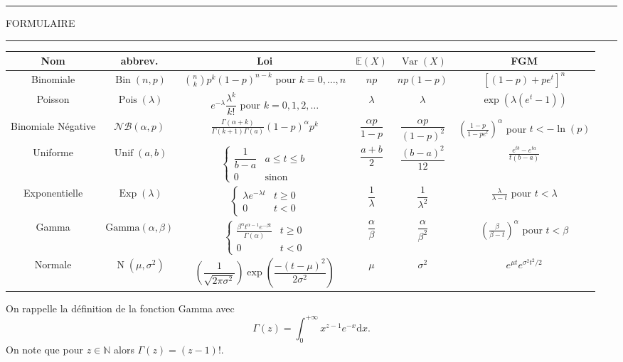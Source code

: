 \documentclass[11pt, addpoints, answers]{exam}
\def\Bin{\operatorname{Bin}}
\def\Var{\operatorname{Var}}
\def\Pois{\operatorname{Pois}}
\def\Exp{\operatorname{Exp}}
\def\Unif{\operatorname{Unif}}
\def\No{\operatorname{N}}
\newcommand{\E}{\mathbb E}            %
\def\Var{\operatorname{Var}}
\begin{document}
\newpage
\hrule
\vspace*{.15in}
\begin{center}
  \large\MakeUppercase{Formulaire}
\end{center}
\vspace*{.15in}
\hrule
\vspace*{.25in}

\renewcommand\arraystretch{3.5}
\begin{table}[H]
\begin{center}
\footnotesize
\begin{tabular}{|c|c|c|c|c|c|}

\hline
Nom & abbrev. & Loi & $\E(X)$ & $\Var(X)$ & FGM\\
\hline\hline
Binomiale & $\Bin(n,p)$ & $\binom{n}{k}p^k(1-p)^{n-k}$ pour $k = 0,\ldots,n$ & $np$ & $np(1-p)$ & $[(1-p)+pe^t]^n$\\
\hline
Poisson & $\Pois(\lambda)$ & $e^{-\lambda}\dfrac{\lambda^k}{k!}$ pour $k = 0,1,2,\ldots$ & $\lambda$ & $\lambda$ &$ \exp(\lambda(e^t-1))$\\
\hline
Binomiale Négative & $\mathcal{NB}(\alpha, p)$ & $\frac{\Gamma(\alpha+k)}{\Gamma(k+1)\Gamma(a)}(1-p)^{\alpha}p^k$ & $\dfrac{\alpha p }{1-p}$ & $\dfrac{\alpha p }{(1-p)^2}$ & $\left(\frac{1-p}{1-pe^t}\right)^\alpha$ pour  $t<-\ln(p)$\\
\hline
Uniforme & $\Unif(a,b)$ & $\begin{cases} \dfrac{1}{b-a} & a\leq t\leq b\\ 0 & \text{sinon}\end{cases}
$ & $\dfrac{a+b}{2}$ & $\dfrac{(b-a)^2}{12}$ & $\frac{e^{tb}-e^{ta}}{t(b-a)}$\\
\hline
Exponentielle & $\Exp(\lambda)$ & $\begin{cases} \lambda e^{-\lambda t} & t\geq 0 \\ 0 & t<0\end{cases}$ & $\dfrac{1}{\lambda}$ & $\dfrac{1}{\lambda^2}$ & $\frac{\lambda}{\lambda -t}$ pour $t<\lambda$\\
\hline
Gamma & $\text{Gamma}(\alpha,\beta)$ & $\begin{cases} \frac{\beta^\alpha t^{\alpha-1} e^{-\beta t}}{\Gamma(\alpha)} & t\geq 0 \\ 0 & t<0\end{cases}$ & $\dfrac{\alpha}{\beta}$ & $\dfrac{\alpha}{\beta^2}$ & $\left(\frac{\beta}{\beta -t}\right)^\alpha$ pour $t<\beta$\\
\hline
Normale & $\No(\mu,\sigma^2)$ & $\left(\dfrac{1}{\sqrt{2\pi\sigma^2}}\right)\operatorname{exp}{\left(\dfrac{-(t-\mu)^2}{2\sigma^2}\right)}$ & $\mu$ & $\sigma^2$ & $e^{\mu t}e^{\sigma^2t^2/2}$\\
\hline
\end{tabular}
\end{center}
\end{table}%
On rappelle la définition de la fonction Gamma avec 
$$
\Gamma(z) = \int_{0}^{+\infty}x^{z-1}e^{-x}\text{d}x.
$$
On note que pour $z\in \mathbb{N}$ alors $\Gamma(z) = (z-1)!$.
\end{document}
